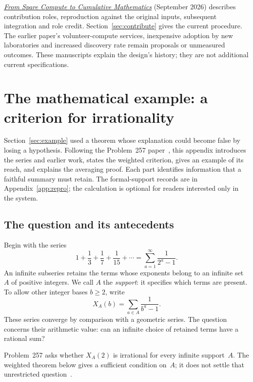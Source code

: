 \documentclass[10pt]{article}
\newcommand{\repobase}{https://github.com/wcook04/plectis-erdos}
\newcommand{\reporef}[2]{\href{\repobase/blob/992cf60a27efd8c34f437e347c413bb781d75c32/#1}{#2}}
\begin{document}
\emph{\reporef{paper/systems/open-source-mathematics-strategy.tex}{From Spare Compute to Cumulative Mathematics}} (September 2026) describes contribution roles, reproduction against the original inputs, subsequent integration and role credit. Section~\ref{sec:contribute} gives the current procedure. The earlier paper's volunteer-compute services, inexpensive adoption by new laboratories and increased discovery rate remain proposals or unmeasured outcomes. These manuscripts explain the design's history; they are not additional current specifications.

\section{The mathematical example: a criterion for irrationality}\label{app:worked-proof}

Section~\ref{sec:example} used a theorem whose explanation could become false by losing a hypothesis. Following the Problem~257 paper~\cite{paper257}, this appendix introduces the series and earlier work, states the weighted criterion, gives an example of its reach, and explains the averaging proof. Each part identifies information that a faithful summary must retain. The formal-support records are in Appendix~\ref{app:repro}; the calculation is optional for readers interested only in the system.

\subsection{The question and its antecedents}

Begin with the series
\[
 1+\frac13+\frac17+\frac1{15}+\cdots
 =\sum_{a=1}^{\infty}\frac1{2^a-1}.
\]
An infinite subseries retains the terms whose exponents belong to an infinite set $A$ of positive integers. We call $A$ the \emph{support}: it specifies which terms are present. To allow other integer bases $b\ge2$, write
\[
 X_A(b)=\sum_{a\in A}\frac1{b^a-1}.
\]
These series converge by comparison with a geometric series. The question concerns their arithmetic value: can an infinite choice of retained terms have a rational sum?

Problem~257 asks whether $X_A(2)$ is irrational for every infinite support~$A$. The weighted theorem below gives a sufficient condition on~$A$; it does not settle that unrestricted question~\cite{paper257,erdosproblems}.
\end{document}
